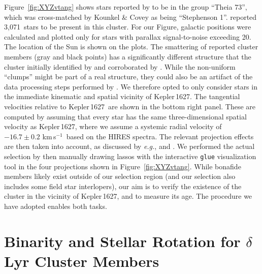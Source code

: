 \documentclass[12pt,modern,twocolumn,tighten]{aastex63}
\newcommand{\sn}{Kepler\,1627} %
\newcommand{\noriginal}{3{,}071} %
\newcommand{\kms}{\,km\,s$^{-1}$}
\begin{document}
Figure~\ref{fig:XYZvtang} shows stars reported by
\citet{kounkel_untangling_2019} to be in the group ``Theia 73'', which
was cross-matched by Kounkel \& Covey as being ``Stephenson 1''.
\citet{kounkel_untangling_2019} reported \noriginal\ stars to be
present in this cluster.  For our Figure, galactic positions were
calculated and plotted only for stars with parallax signal-to-noise
exceeding 20.  The location of the Sun is shown on the plots.  The
smattering of reported cluster members (gray and black points) has a
significantly different structure that the cluster initially
identified by \citet{stephenson_possible_1959} and corroborated by
\citet{eggen_photometric_1968}.  While the non-uniform ``clumps''
might be part of a real structure, they could also be an artifact of
the data processing steps performed by
\citet{kounkel_untangling_2019}.  We therefore opted to only consider
stars in the immediate kinematic and spatial vicinity of \sn.  The
tangential velocities relative to \sn\ are shown in the bottom right
panel.  These are computed by assuming that every star has the same
three-dimensional spatial velocity as \sn, where we assume a systemic
radial velocity of $-16.7 \pm 0.2$\,\kms\ based on the HIRES
spectra.  The
relevant projection effects are then taken into account, as discussed
by {\it e.g.}, \citet{Meingast2021} and \citet{bouma_2021_ngc2516}.
We performed the actual selection by then manually drawing lassos with
the interactive \texttt{glue} visualization tool
\citep{beaumont_2014_13866} in the four projections shown in
Figure~\ref{fig:XYZvtang}.  While bonafide members likely exist
outside of our selection region (and our selection also includes some
field star interlopers), our aim is to verify the existence of the
cluster in the vicinity of Kepler\,1627, and to measure its age.  The
procedure we have adopted enables both tasks.


\section{Binarity and Stellar Rotation for $\delta$\,Lyr Cluster Members}
\label{app:rotationbinarity}
\end{document}
